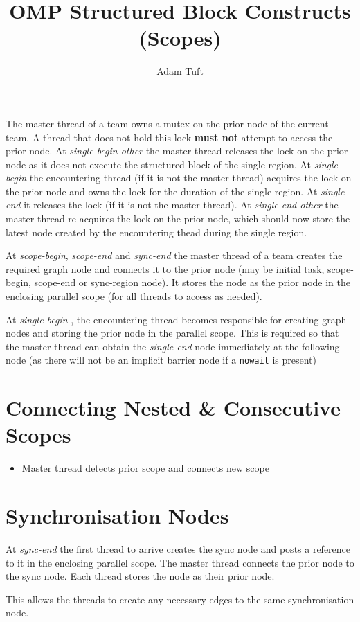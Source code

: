 \documentclass[11pt,a4paper]{article}
\title{OMP Structured Block Constructs (Scopes)}
\newcommand{\code}[1]{\texttt{#1} }
\begin{document}
\author{Adam Tuft}
\maketitle

The master thread of a team owns a mutex on the prior node of the current team. A thread that does not hold this lock \textbf{must not} attempt to access the prior node. At \emph{single-begin-other} the master thread releases the lock on the prior node as it does not execute the structured block of the single region. At \emph{single-begin} the encountering thread (if it is not the master thread) acquires the lock on the prior node and owns the lock for the duration of the single region. At \emph{single-end} it releases the lock (if it is not the master thread). At \emph{single-end-other} the master thread re-acquires the lock on the prior node, which should now store the latest node created by the encountering thead during the single region.

At \emph{scope-begin}, \emph{scope-end} and \emph{sync-end} the master thread of a team creates the required graph node and connects it to the prior node (may be initial task, scope-begin, scope-end or sync-region node). It stores the node as the prior node in the enclosing parallel scope (for all threads to access as needed).

At \emph{single-begin} , the encountering thread becomes responsible for creating graph nodes and storing the prior node in the parallel scope. This is required so that the master thread can obtain the \emph{single-end} node immediately at the following node (as there will not be an implicit barrier node if a \code{nowait} is present)

\section{Connecting Nested \& Consecutive Scopes}

\begin{itemize}
\item Master thread detects prior scope and connects new scope
\end{itemize}

\section{Synchronisation Nodes}

At \emph{sync-end} the first thread to arrive creates the sync node and posts a reference to it in the enclosing parallel scope. The master thread connects the prior node to the sync node. Each thread stores the node as their prior node.

This allows the threads to create any necessary edges to the same synchronisation node.
\end{document}
